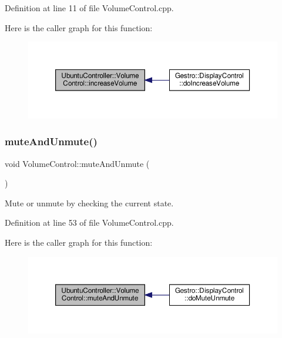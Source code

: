 Definition at line 11 of file Volume\+Control.\+cpp.

Here is the caller graph for this function\+:
\nopagebreak
\begin{figure}[H]
\begin{center}
\leavevmode
\includegraphics[width=350pt]{class_ubuntu_controller_1_1_volume_control_a6b51293368c1740b9bee0b8a4e7ed421_icgraph}
\end{center}
\end{figure}
\mbox{\label{class_ubuntu_controller_1_1_volume_control_a77273bc06d0f25068045860b0c6b4f91}} 
\subsubsection{\texorpdfstring{mute\+And\+Unmute()}{muteAndUnmute()}}
{\footnotesize\ttfamily void Volume\+Control\+::mute\+And\+Unmute (\begin{DoxyParamCaption}{ }\end{DoxyParamCaption})}

Mute or unmute by checking the current state. 

Definition at line 53 of file Volume\+Control.\+cpp.

Here is the caller graph for this function\+:
\nopagebreak
\begin{figure}[H]
\begin{center}
\leavevmode
\includegraphics[width=350pt]{class_ubuntu_controller_1_1_volume_control_a77273bc06d0f25068045860b0c6b4f91_icgraph}
\end{center}
\end{figure}
\mbox{\label{class_ubuntu_controller_1_1_volume_control_ad8e3e3740268388e906984fa807761a1}} 
